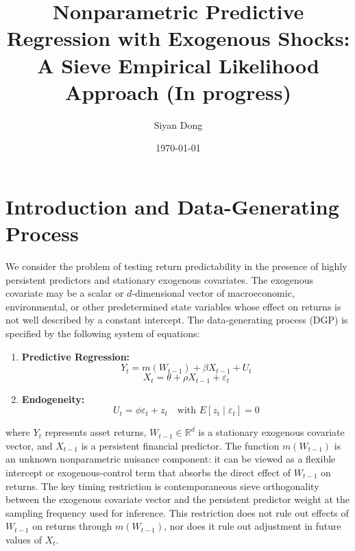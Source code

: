 \documentclass{article}
\begin{document}
\title{Nonparametric Predictive Regression with Exogenous Shocks: A Sieve Empirical Likelihood Approach (In progress)}
\author{Siyan Dong}
\date{\today}
\maketitle

\section{Introduction and Data-Generating Process}

We consider the problem of testing return predictability in the presence of
highly persistent predictors and stationary exogenous covariates. The
exogenous covariate may be a scalar or $d$-dimensional vector of
macroeconomic, environmental, or other predetermined state variables whose
effect on returns is not well described by a constant intercept. The
data-generating process (DGP) is specified by the
following system of equations:

\begin{enumerate}
    \item \textbf{Predictive Regression:}
    \begin{equation}
        Y_t = m(W_{t-1}) + \beta X_{t-1} + U_t
    \end{equation}
    \begin{equation}
        X_t = \theta + \rho X_{t-1} + \varepsilon_t
    \end{equation}
    
    \item \textbf{Endogeneity:}
    \begin{equation}
        U_t = \phi \varepsilon_t + z_t \quad \text{with } E[z_t \mid \varepsilon_t] = 0
    \end{equation}
\end{enumerate}
where $Y_t$ represents asset returns, $W_{t-1} \in \mathbb{R}^d$ is a
stationary exogenous covariate vector, and $X_{t-1}$ is a persistent financial
predictor. The function
$m(W_{t-1})$ is an unknown nonparametric nuisance component: it can be viewed
as a flexible intercept or exogenous-control term that absorbs the direct
effect of $W_{t-1}$ on returns. The key timing restriction is contemporaneous
sieve orthogonality between the exogenous covariate vector and the persistent
predictor weight at the sampling frequency used for inference. This
restriction does not rule out effects of $W_{t-1}$ on returns through
$m(W_{t-1})$, nor does it rule out adjustment in future values of $X_t$.
\end{document}

